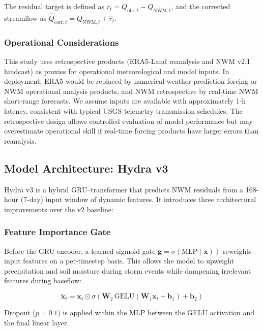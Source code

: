 \documentclass[draft]{agujournal2019}
\begin{document}
The residual target is defined as $r_t = Q_{\text{obs},t} - Q_{\text{NWM},t}$, and the corrected streamflow as $\hat{Q}_{\text{corr},t} = Q_{\text{NWM},t} + \hat{r}_t$.

\subsubsection*{Operational Considerations}
This study uses retrospective products (ERA5-Land reanalysis and NWM v2.1 hindcast) as proxies for operational meteorological and model inputs. In deployment, ERA5 would be replaced by numerical weather prediction forcing or NWM operational analysis products, and NWM retrospective by real-time NWM short-range forecasts. We assume inputs are available with approximately 1-h latency, consistent with typical USGS telemetry transmission schedules. The retrospective design allows controlled evaluation of model performance but may overestimate operational skill if real-time forcing products have larger errors than reanalysis.

\subsection{Model Architecture: Hydra v3}

Hydra v3 is a hybrid GRU--transformer \cite{cho2014,vaswani2017} that predicts NWM residuals from a 168-hour (7-day) input window of dynamic features. It introduces three architectural improvements over the v2 baseline:

\subsubsection*{Feature Importance Gate}
Before the GRU encoder, a learned sigmoid gate $\mathbf{g} = \sigma(\text{MLP}(\mathbf{x}))$ reweights input features on a per-timestep basis. This allows the model to upweight precipitation and soil moisture during storm events while dampening irrelevant features during baseflow:
\begin{linenomath*}
\begin{equation}
    \tilde{\mathbf{x}}_t = \mathbf{x}_t \odot \sigma\!\left(\mathbf{W}_2 \, \text{GELU}(\mathbf{W}_1 \mathbf{x}_t + \mathbf{b}_1) + \mathbf{b}_2\right)
\end{equation}
\end{linenomath*}
Dropout ($p=0.1$) is applied within the MLP between the GELU activation and the final linear layer.
\end{document}
